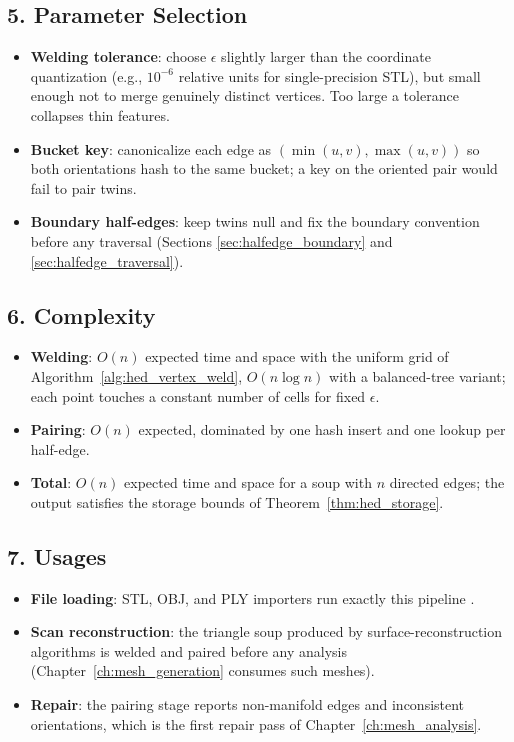 \subsection{5. Parameter Selection}

\begin{itemize}
  \item \textbf{Welding tolerance}: choose $\epsilon$ slightly larger than
    the coordinate quantization (e.g., $10^{-6}$ relative units for
    single-precision STL), but small enough not to merge genuinely
    distinct vertices. Too large a tolerance collapses thin features.
  \item \textbf{Bucket key}: canonicalize each edge as
    $(\min(u,v), \max(u,v))$ so both orientations hash to the same bucket;
    a key on the oriented pair would fail to pair twins.
  \item \textbf{Boundary half-edges}: keep twins null and fix the boundary
    convention before any traversal (Sections
    \ref{sec:halfedge_boundary} and \ref{sec:halfedge_traversal}).
\end{itemize}

\subsection{6. Complexity}

\begin{itemize}
  \item \textbf{Welding}: $O(n)$ expected time and space with the uniform
    grid of Algorithm~\ref{alg:hed_vertex_weld}, $O(n \log n)$ with a
    balanced-tree variant; each point touches a constant number of cells
    for fixed $\epsilon$.
  \item \textbf{Pairing}: $O(n)$ expected, dominated by one hash insert and
    one lookup per half-edge.
  \item \textbf{Total}: $O(n)$ expected time and space for a soup with $n$
    directed edges; the output satisfies the storage bounds of
    Theorem~\ref{thm:hed_storage}.
\end{itemize}

\subsection{7. Usages}

\begin{itemize}
  \item \textbf{File loading}: STL, OBJ, and PLY importers run exactly this
    pipeline \cite{botsch2010,ericson2004}.
  \item \textbf{Scan reconstruction}: the triangle soup produced by
    surface-reconstruction algorithms is welded and paired before any
    analysis (Chapter~\ref{ch:mesh_generation} consumes such meshes).
  \item \textbf{Repair}: the pairing stage reports non-manifold edges and
    inconsistent orientations, which is the first repair pass of
    Chapter~\ref{ch:mesh_analysis}.
\end{itemize}

